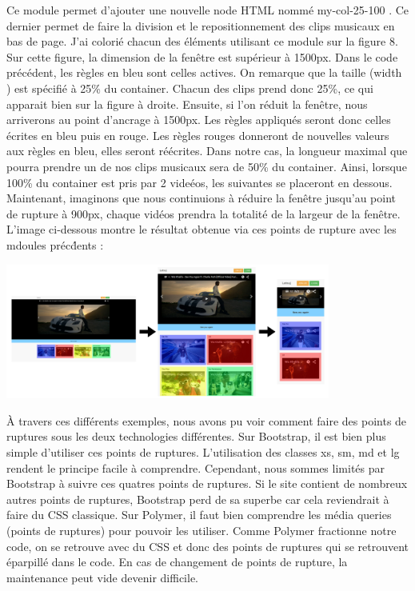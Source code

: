 \documentclass{article}
\begin{document}
Ce module permet d'ajouter une nouvelle node HTML nomm\'e \og my-col-25-100 \fg{}. Ce dernier permet de faire la division et le repositionnement des clips musicaux en bas de page. J'ai colori\'e chacun des \'el\'ements utilisant ce module sur la figure 8. Sur cette figure, la dimension de la fen\^etre est sup\'erieur \`a 1500px. Dans le code pr\'ec\'edent, les r\`egles en bleu sont celles actives. On remarque que la taille (\og width \fg{} ) est sp\'ecifi\'e \`a 25\% du container. Chacun des clips prend donc 25\%, ce qui apparait bien sur la figure \`a droite. Ensuite, si l'on r\'eduit la fen\^etre, nous arriverons au point d'ancrage \`a 1500px. Les r\`egles appliqu\'es seront donc celles \'ecrites en bleu puis en rouge. Les r\`egles rouges donneront de nouvelles valeurs aux r\`egles en bleu, elles seront r\'e\'ecrites. Dans notre cas, la longueur maximal que pourra prendre un de nos clips musicaux sera de 50\% du container. Ainsi, lorsque 100\% du container est pris par 2 vide\'eos, les suivantes se placeront en dessous. Maintenant, imaginons que nous continuions \`a r\'eduire la fen\^etre jusqu'au point de rupture \`a 900px, chaque vid\'eos prendra la totalit\'e de la largeur de la fen\^etre. L'image ci-dessous montre le r\'esultat obtenue via ces points de rupture avec les mdoules pr\'ec\'dents :

\begin{center}
\vspace{0.5cm}
\includegraphics[width=0.8\textwidth]{pc7}
\vspace{0.5cm}\\
\end{center}

\`A travers ces diff\'erents exemples, nous avons pu voir comment faire des points de ruptures sous les deux technologies diff\'erentes. Sur Bootstrap, il est bien plus simple d'utiliser ces points de ruptures. L'utilisation des classes xs, sm, md et lg rendent le principe facile \`a comprendre. Cependant, nous sommes limit\'es par Bootstrap \`a suivre ces quatres points de ruptures. Si le site contient de nombreux autres points de ruptures, Bootstrap perd de sa superbe car cela reviendrait \`a faire du CSS classique. Sur Polymer, il faut bien comprendre les m\'edia queries (points de ruptures) pour pouvoir les utiliser. Comme Polymer fractionne notre code, on se retrouve avec du CSS et donc des points de ruptures qui se retrouvent \'eparpill\'e dans le code. En cas de changement de points de rupture, la maintenance peut vide devenir difficile. 
\end{document}
